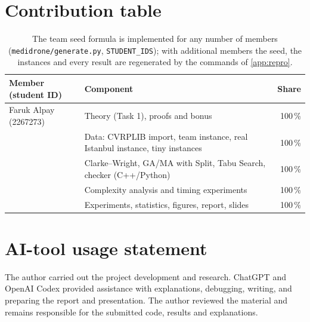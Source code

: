 \section{Contribution table}\label{app:contrib}
\begin{table}[h]
\centering\small
\begin{tabular}{@{}l l r@{}}
\toprule
Member (student ID) & Component & Share \\
\midrule
Faruk Alpay (2267273) & Theory (Task 1), proofs and bonus & 100\,\% \\
 & Data: CVRPLIB import, team instance, real Istanbul instance, tiny instances & 100\,\% \\
 & Clarke--Wright, GA/MA with Split, Tabu Search, checker (C++/Python) & 100\,\% \\
 & Complexity analysis and timing experiments & 100\,\% \\
 & Experiments, statistics, figures, report, slides & 100\,\% \\
\bottomrule
\end{tabular}
\caption*{The team seed formula is implemented for any number of members (\texttt{medidrone/generate.py},
\texttt{STUDENT\_IDS}); with additional members the seed, the instances and every result are regenerated by the
commands of \cref{app:repro}.}
\end{table}

\section{AI-tool usage statement}
The author carried out the project development and research. ChatGPT and OpenAI Codex
provided assistance with explanations, debugging, writing, and preparing the report and
presentation. The author reviewed the material and remains responsible for the submitted
code, results and explanations.

